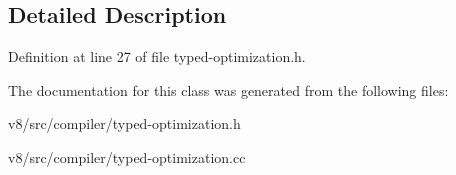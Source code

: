\subsection{Detailed Description}


Definition at line 27 of file typed-\/optimization.\+h.



The documentation for this class was generated from the following files\+:\begin{DoxyCompactItemize}
\item 
v8/src/compiler/typed-\/optimization.\+h\item 
v8/src/compiler/typed-\/optimization.\+cc\end{DoxyCompactItemize}
